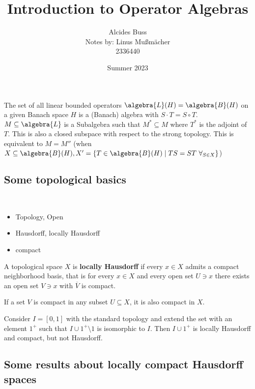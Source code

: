 \documentclass[a4paper]{article}
\title{Introduction to Operator Algebras}
\author{Alcides Buss\\Notes by: Linus Mußmächer\\2336440}
\date{Summer 2023}
\begin{document}
\maketitle

\newpage

\tableofcontents

\newpage

The set of all linear bounded operators $\algebra{L}(H) = \algebra{B}(H)$ on a given Banach space $H$ is a (Banach) algebra with $S \cdot T = S \circ T$.
$M \subseteq \algebra{L}$ is a Subalgebra such that $M^* \subseteq M$ where $T^*$ is the adjoint of $T$.
This is also a closed subspace with respect to the strong topology. This is equivalent to $M = M''$ (when $X \subseteq \algebra{B}(H), X' = \{ T \in \algebra{B}(H) \mid TS = ST \ \forall_{ S \in X} \}$)

\subsection*{Some topological basics}

\begin{definition}~
	\begin{itemize}
		\item Topology, Open
		\item Hausdorff, locally Hausdorff
		\item compact
	\end{itemize}
\end{definition}

\begin{definition}
	A topological space $X$ is \textbf{locally Hausdorff} if every $x \in X$ admits a compact neighborhood basis, that is for every $x \in X$ and every open set $U \ni x$ there exists an open set $V \ni x$ with $\overline{V}$ is compact.
\end{definition}

\begin{corollary}
	If a set $V$ is compact in any subset $U \subseteq X$, it is also compact in $X$.
\end{corollary}

\begin{example}
	Consider $I = [0,1]$ with the standard topology and extend the set with an element $1^+$ such that $I \cup 1^+ \setminus 1$ is isomorphic to $I$. Then $I \cup 1^+$ is locally Hausdorff and compact, but not Hausdorff.
\end{example}

\subsection*{Some results about locally compact Hausdorff spaces}
\end{document}
